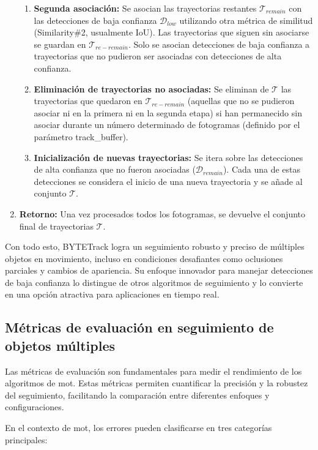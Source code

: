 \documentclass[11pt,spanish,listoffigures,listoftables]{tfgetsinf}
\begin{document}
\begin{enumerate}
{\begin{enumerate}
      \item \textbf{Segunda asociación:} Se asocian las trayectorias restantes $\mathcal{T}_{remain}$ con las detecciones de baja confianza $\mathcal{D}_{low}$ utilizando otra métrica de similitud (Similarity\#2, usualmente IoU). Las trayectorias que siguen sin asociarse se guardan en $\mathcal{T}_{re-remain}$. Solo se asocian detecciones de baja confianza a trayectorias que no pudieron ser asociadas con detecciones de alta confianza.
      \item \textbf{Eliminación de trayectorias no asociadas:} Se eliminan de $\mathcal{T}$ las trayectorias que quedaron en $\mathcal{T}_{re-remain}$ (aquellas que no se pudieron asociar ni en la primera ni en la segunda etapa) si han permanecido sin asociar durante un número determinado de fotogramas (definido por el parámetro track\_buffer).
      \item \textbf{Inicialización de nuevas trayectorias:} Se itera sobre las detecciones de alta confianza que no fueron asociadas ($\mathcal{D}_{remain}$). Cada una de estas detecciones se considera el inicio de una nueva trayectoria y se añade al conjunto $\mathcal{T}$.
   \end{enumerate}
   } %
   \item \textbf{Retorno:} Una vez procesados todos los fotogramas, se devuelve el conjunto final de trayectorias $\mathcal{T}$.
\end{enumerate}


Con todo esto, BYTETrack logra un seguimiento robusto y preciso de múltiples objetos en movimiento, incluso en condiciones desafiantes como oclusiones parciales y cambios de apariencia. Su enfoque innovador para manejar detecciones de baja confianza lo distingue de otros algoritmos de seguimiento y lo convierte en una opción atractiva para aplicaciones en tiempo real.


\subsection{Métricas de evaluación en seguimiento de objetos múltiples} \label{sec:metricas_mot}


Las métricas de evaluación son fundamentales para medir el rendimiento de los algoritmos de \gls{mot}. Estas métricas permiten cuantificar la precisión y la robustez del seguimiento, facilitando la comparación entre diferentes enfoques y configuraciones.

En el contexto de \gls{mot}, los errores pueden clasificarse en tres categorías principales:
\end{document}
